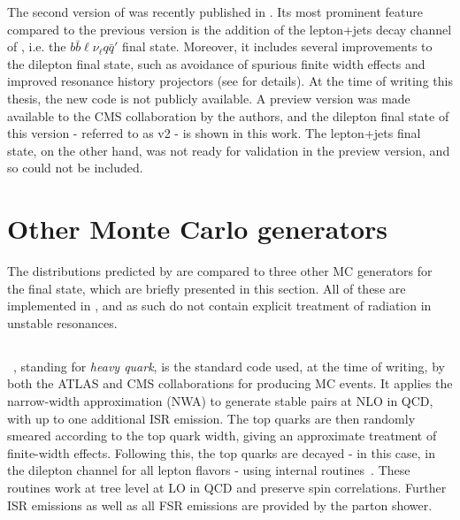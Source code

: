 The second version of \bbfourl was recently published in . Its most prominent feature compared to the previous version is the addition of the lepton+jets decay channel of \ttbar, i.e. the $b \bar{b} \ell \nu_{\ell} q \bar{q}'$ final state. Moreover, it includes several improvements to the dilepton final state, such as avoidance of spurious finite width effects and improved resonance history projectors (see  for details). At the time of writing this thesis, the new code is not publicly available. A preview version was made available to the CMS collaboration by the authors, and the dilepton final state of this version - referred to as \bbfourl v2 - is shown in this work. The lepton+jets final state, on the other hand, was not ready for validation in the preview version, and so could not be included.

\section{Other \ttbartitle Monte Carlo generators}
\label{sec:bb4l:others}

The distributions predicted by \bbfourl are compared to three other MC generators for the \tttW final state, which are briefly presented in this section. All of these are implemented in \powhegvtwo, and as such do not contain explicit treatment of radiation in unstable resonances.

\subsection{\texorpdfstring{\hvq}{hvq}}

\hvq~\cite{Frixione:2007nw}, standing for \textit{heavy quark}, is the standard code used, at the time of writing, by both the ATLAS and CMS collaborations for producing \ttbar MC events. It applies the narrow-width approximation (NWA) to generate stable \ttbar pairs at NLO in QCD, with up to one additional ISR emission. The top quarks are then randomly smeared according to the top quark width, giving an approximate treatment of finite-width effects. Following this, the top quarks are decayed - in this case, in the dilepton channel for all lepton flavors - using internal \powheg routines~\cite{Frixione:2007zp}. These routines work at tree level at LO in QCD and preserve spin correlations. Further ISR emissions as well as all FSR emissions are provided by the parton shower.

\subsection{\texorpdfstring{\ST}{ST\_wtch}}

